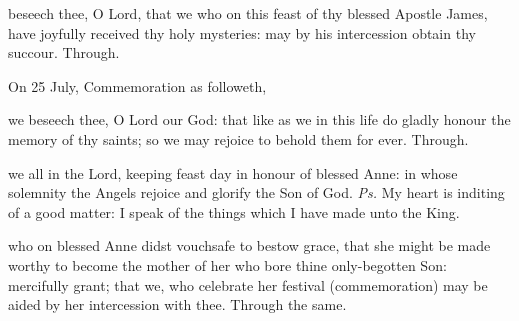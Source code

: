 
\postcommunion
{} beseech thee, O Lord, that we who on this feast of thy blessed Apostle James, have joyfully received thy holy mysteries: may by his intercession obtain thy succour. Through.
\begin{rubric}
	 On 25 July, Commemoration  as followeth,
\end{rubric}
 we beseech thee, O Lord our God: that like as we in this life do gladly honour the memory of thy saints; so we may rejoice to behold them for ever. Through.



\introit
{} we all in the Lord, keeping feast day in honour of blessed Anne: in whose solemnity the Angels rejoice and glorify the Son of God. \textit{Ps.} My heart is inditing of a good matter: I speak of the things which I have made unto the King.

\collect
{} who on blessed Anne didst vouchsafe to bestow grace, that she might be made worthy to become the mother of her who bore thine only-begotten Son: mercifully grant; that we, who celebrate her festival (commemoration) may be aided by her intercession with thee. Through the same.

